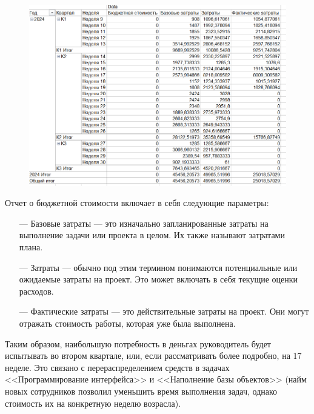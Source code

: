 \begin{figure}[h!]
	\begin{center}
		\includegraphics[scale=0.6]{inc/img/p_5.png}
	\end{center}
	\captionsetup{justification=centering}
	\label{fig:u3}
\end{figure}

\newpage

Отчет о бюджетной стоимости включает в себя следующие параметры:

\begin{itemize}
    \item[---] Базовые затраты --- это изначально запланированные затраты на выполнение задачи или проекта в целом. Их также называют затратами плана.
    \item[---] Затраты --- обычно под этим термином понимаются потенциальные или ожидаемые затраты на проект. Это может включать в себя текущие оценки расходов.
    \item[---] Фактические затраты --- это действительные затраты на проект. Они могут отражать стоимость работы, которая уже была выполнена.
\end{itemize}

Таким образом, наибольшую потребность в деньгах руководитель будет испытывать во втором квартале, или, если рассматривать более подробно, на 17 неделе. Это связано с перераспределением средств в задачах <<Программирование интерфейса>> и <<Наполнение базы объектов>> (найм новых сотрудников позволил уменьшить время выполнения задач, однако стоимость их на конкретную неделю возрасла).

\newpage


